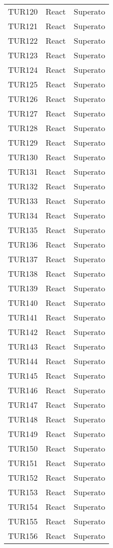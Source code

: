 \documentclass[PianoDiQualifica.tex]{subfiles}
\begin{document}
\begin{longtable}[H]{P{2cm}P{8.5cm}P{3cm}}
	TUR120 & React & Superato \\ 
	TUR121 & React & Superato \\ 
	TUR122 & React & Superato \\ 
	TUR123 & React & Superato \\ 
	TUR124 & React & Superato \\ 
	TUR125 & React & Superato \\ 
	TUR126 & React & Superato \\ 
	TUR127 & React & Superato \\ 
	TUR128 & React & Superato \\ 
	TUR129 & React & Superato \\ 
	TUR130 & React & Superato \\ 
	TUR131 & React & Superato \\ 
	TUR132 & React & Superato \\ 
	TUR133 & React & Superato \\ 
	TUR134 & React & Superato \\ 
	TUR135 & React & Superato \\ 
	TUR136 & React & Superato \\ 
	TUR137 & React & Superato \\ 
	TUR138 & React & Superato \\ 
	TUR139 & React & Superato \\ 
	TUR140 & React & Superato \\ 
	TUR141 & React & Superato \\ 
	TUR142 & React & Superato \\ 
	TUR143 & React & Superato \\ 
	TUR144 & React & Superato \\ 
	TUR145 & React & Superato \\ 
	TUR146 & React & Superato \\ 
	TUR147 & React & Superato \\ 
	TUR148 & React & Superato \\ 
	TUR149 & React & Superato \\ 
	TUR150 & React & Superato \\ 
	TUR151 & React & Superato \\ 
	TUR152 & React & Superato \\ 
	TUR153 & React & Superato \\ 
	TUR154 & React & Superato \\ 
	TUR155 & React & Superato \\ 
	TUR156 & React & Superato \\ 

\end{longtable}
\end{document}
